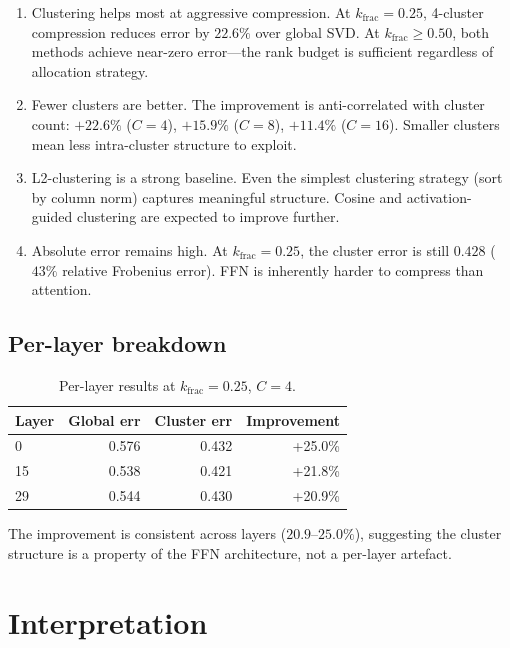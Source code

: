 \documentclass[11pt]{article}
\begin{document}
\begin{enumerate}
\item Clustering helps most at aggressive compression.
      At $k_\text{frac}{=}0.25$, 4-cluster compression reduces error by
      $22.6\%$ over global SVD.  At $k_\text{frac}{\ge}0.50$, both
      methods achieve near-zero error---the rank budget is sufficient
      regardless of allocation strategy.

\item Fewer clusters are better.  The improvement is
      anti-correlated with cluster count: $+22.6\%$ ($C{=}4$),
      $+15.9\%$ ($C{=}8$), $+11.4\%$ ($C{=}16$).  Smaller clusters
      mean less intra-cluster structure to exploit.

\item L2-clustering is a strong baseline.  Even the simplest
      clustering strategy (sort by column norm) captures meaningful
      structure.  Cosine and activation-guided clustering are expected
      to improve further.

\item Absolute error remains high.  At $k_\text{frac}{=}0.25$,
      the cluster error is still $0.428$ ($43\%$ relative Frobenius
      error).  FFN is inherently harder to compress than attention.
\end{enumerate}

\subsection{Per-layer breakdown}

\begin{table}[h]\centering\small
\caption{Per-layer results at $k_\text{frac}{=}0.25$, $C{=}4$.}
\label{tab:ffn-per-layer}
\begin{tabular}{@{}lrrr@{}}
\toprule
Layer & Global err & Cluster err & Improvement \\
\midrule
0  & 0.576 & 0.432 & +25.0\% \\
15 & 0.538 & 0.421 & +21.8\% \\
29 & 0.544 & 0.430 & +20.9\% \\
\bottomrule
\end{tabular}
\end{table}

The improvement is consistent across layers ($20.9$--$25.0\%$), suggesting
the cluster structure is a property of the FFN architecture, not a
per-layer artefact.

\section{Interpretation}
\label{sec:interpretation}
\end{document}
